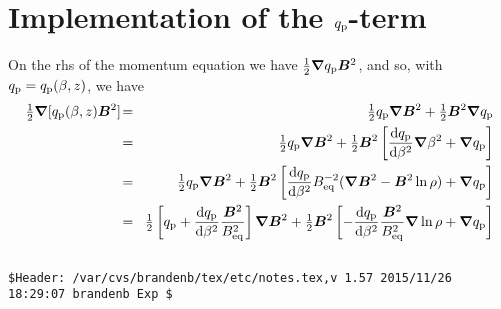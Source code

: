 \documentclass{article}
\title{}
\author{}
\date{\today,~ $ $Revision: 1.57 $ $}
\begin{document}
\maketitle

\section{Implementation of the $q_{\rm p}$-term}

On the rhs of the momentum equation we have ${\textstyle{1\over2}}{\bm{\nabla}}q_{\rm p}\bm{B}^2$, and so,
with $q_{\rm p}=q_{\rm p}(\beta,z)$, we have
\begin{eqnarray}
\half\nab[\qp(\beta,z)\BB^2]
\!&=&\!\half\qp\nab\BB^2+\half\BB^2\nab\qp\\
\!&=&\!\half\qp\nab\BB^2+\half\BB^2\left[{\dd\qp\over\dd\beta^2}\nab\beta^2+\nab\qp\right]
\\
\!&=&\!\half\qp\nab\BB^2+\half\BB^2\left[{\dd\qp\over\dd\beta^2}\Beq^{-2}(
\nab\BB^2-\BB^2\ln\rho)+\nab\qp\right]
\\
\!&=&\!\half\left[\qp+{\dd\qp\over\dd\beta^2}{\BB^2\over\Beq^2}\right]\nab\BB^2
+\half\BB^2\left[-{\dd\qp\over\dd\beta^2}{\BB^2\over\Beq^2}\nab\ln\rho+\nab\qp\right]
\end{eqnarray}



\begin{verbatim}
\end{verbatim}





\vfill\bigskip\noindent\tiny\begin{verbatim}
$Header: /var/cvs/brandenb/tex/etc/notes.tex,v 1.57 2015/11/26 18:29:07 brandenb Exp $
\end{verbatim}
\end{document}
